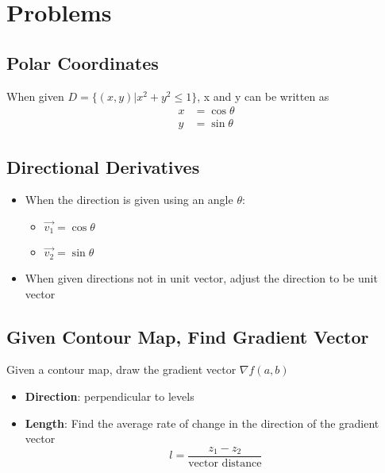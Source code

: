 \section{Problems}

  \subsection{Polar Coordinates}

    When given $ D = \{ \left( x, y \right) | x^{2} + y^{2} \le 1 \} $,
    x and y can be written as
    \begin{align*}
      x &= \cos\theta \\
      y &= \sin\theta
    \end{align*}

  \subsection{Directional Derivatives}

    \begin{itemize}
      \item When the direction is given using an angle $ \theta $:
      \begin{itemize}
        \item $ \vec{v_{1}} = \cos\theta $
        \item $ \vec{v_{2}} = \sin\theta $
      \end{itemize}

      \item When given directions not in unit vector, adjust the direction
      to be unit vector
    \end{itemize}

  \subsection{Given Contour Map, Find Gradient Vector}

    Given a contour map, draw the gradient vector
    $ \nabla f\left( a, b \right) $

    \begin{itemize}
      \item \textbf{Direction}: perpendicular to levels
      \item \textbf{Length}: Find the average rate of change in the direction
      of the gradient vector
      \begin{displaymath}
        l = \frac{z_{1} - z_{2}}{\text{vector distance}}
      \end{displaymath}
    \end{itemize}

